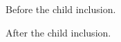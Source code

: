 \documentclass{article}
\begin{document}
Before the child inclusion.

After the child inclusion.
\end{document}
